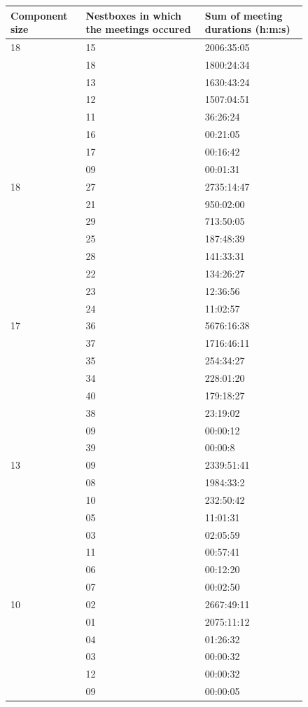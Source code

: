 \begin{figure}[p]
\begin{center}
\begin{tabular}{lll}
\toprule
\textbf{Component size} &	\textbf{Nestboxes in which the meetings occured}	&	\textbf{Sum of meeting durations (h:m:s)} \\\midrule
18	& 15	& 2006:35:05 \\
 	& 18	& 1800:24:34 \\
	& 13	& 1630:43:24 \\
	& 12	& 1507:04:51 \\
	& 11	& 36:26:24 \\
	& 16	& 00:21:05 \\
	& 17	& 00:16:42 \\
	& 09	& 00:01:31 \\\midrule

18	& 27	& 2735:14:47 \\
	& 21	& 950:02:00 \\
	& 29	& 713:50:05 \\
	& 25	& 187:48:39 \\
	& 28	& 141:33:31 \\
	& 22	& 134:26:27 \\
	& 23 	& 12:36:56 \\
	& 24	& 11:02:57 \\\midrule

17	& 36	& 5676:16:38 \\
	& 37	& 1716:46:11 \\
	& 35	& 254:34:27 \\
	& 34	& 228:01:20 \\
	& 40	& 179:18:27 \\
	& 38	& 23:19:02 \\
	& 09	& 00:00:12 \\
	& 39	& 00:00:8 \\\midrule

13	& 09	& 2339:51:41 \\
	& 08 	& 1984:33:2 \\
	& 10	& 232:50:42 \\
	& 05	& 11:01:31 \\
	& 03 	& 02:05:59 \\
	& 11 	& 00:57:41 \\
	& 06	& 00:12:20 \\
	& 07	& 00:02:50 \\\midrule
	
10	& 02	& 2667:49:11 \\
	& 01	& 2075:11:12 \\
	& 04	& 01:26:32 \\
	& 03	& 00:00:32 \\
	& 12	& 00:00:32 \\
	& 09	& 00:00:05 \\\midrule


\end{tabular}
\end{center}
\end{figure}
